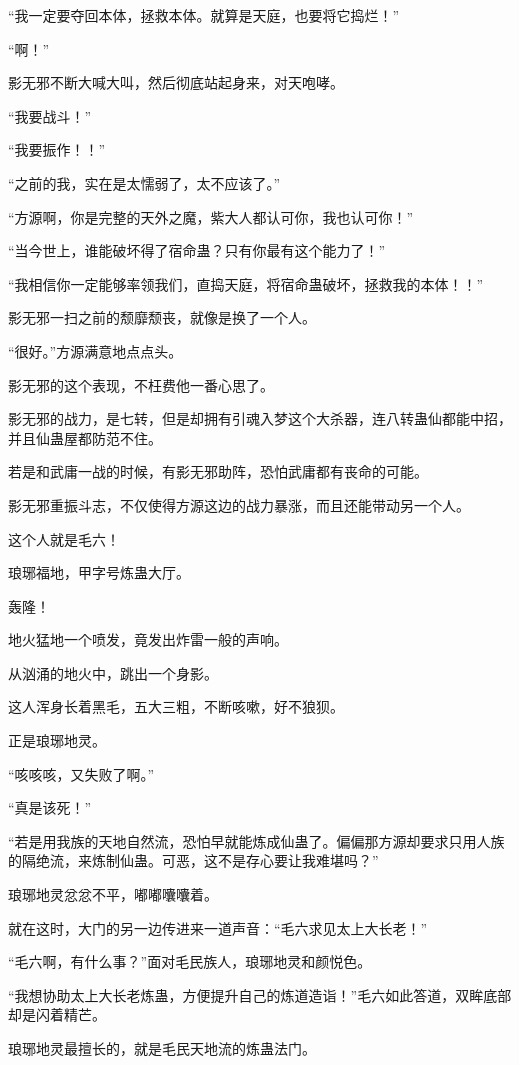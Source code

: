 \begin{this_body}
“我一定要夺回本体，拯救本体。就算是天庭，也要将它捣烂！”

“啊！”

影无邪不断大喊大叫，然后彻底站起身来，对天咆哮。

“我要战斗！”

“我要振作！！”

“之前的我，实在是太懦弱了，太不应该了。”

“方源啊，你是完整的天外之魔，紫大人都认可你，我也认可你！”

“当今世上，谁能破坏得了宿命蛊？只有你最有这个能力了！”

“我相信你一定能够率领我们，直捣天庭，将宿命蛊破坏，拯救我的本体！！”

影无邪一扫之前的颓靡颓丧，就像是换了一个人。

“很好。”方源满意地点点头。

影无邪的这个表现，不枉费他一番心思了。

影无邪的战力，是七转，但是却拥有引魂入梦这个大杀器，连八转蛊仙都能中招，并且仙蛊屋都防范不住。

若是和武庸一战的时候，有影无邪助阵，恐怕武庸都有丧命的可能。

影无邪重振斗志，不仅使得方源这边的战力暴涨，而且还能带动另一个人。

这个人就是毛六！

琅琊福地，甲字号炼蛊大厅。

轰隆！

地火猛地一个喷发，竟发出炸雷一般的声响。

从汹涌的地火中，跳出一个身影。

这人浑身长着黑毛，五大三粗，不断咳嗽，好不狼狈。

正是琅琊地灵。

“咳咳咳，又失败了啊。”

“真是该死！”

“若是用我族的天地自然流，恐怕早就能炼成仙蛊了。偏偏那方源却要求只用人族的隔绝流，来炼制仙蛊。可恶，这不是存心要让我难堪吗？”

琅琊地灵忿忿不平，嘟嘟囔囔着。

就在这时，大门的另一边传进来一道声音：“毛六求见太上大长老！”

“毛六啊，有什么事？”面对毛民族人，琅琊地灵和颜悦色。

“我想协助太上大长老炼蛊，方便提升自己的炼道造诣！”毛六如此答道，双眸底部却是闪着精芒。

琅琊地灵最擅长的，就是毛民天地流的炼蛊法门。


\end{this_body}
